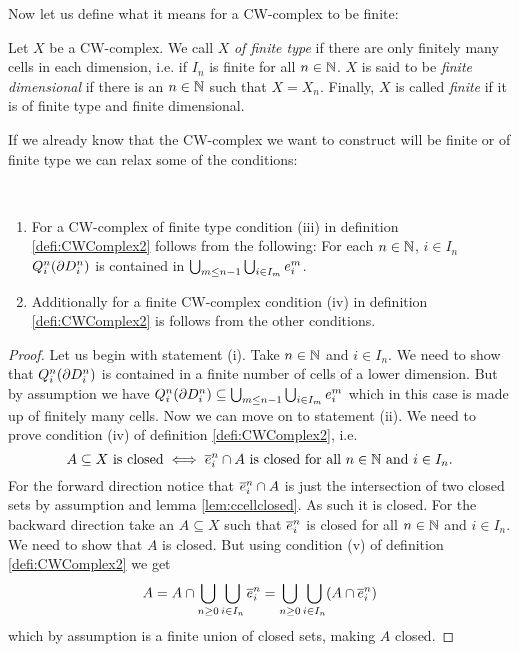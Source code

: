 Now let us define what it means for a CW-complex to be finite: 

\begin{defi}
    Let $X$ be a CW-complex. 
    We call $X$ \emph{of finite type} if there are only finitely many cells in each dimension, i.e. if $I_n$ is finite for all $n \in \bN$.
    $X$ is said to be \emph{finite dimensional} if there is an $n \in \bN$ such that $X = X_n$. 
    Finally, $X$ is called \emph{finite} if it is of finite type and finite dimensional.
\end{defi}

If we already know that the CW-complex we want to construct will be finite or of finite type we can relax some of the conditions: 

\begin{rem}~
    \begin{enumerate}
        \item For a CW-complex of finite type condition (iii) in definition \ref{defi:CWComplex2} follows from the following: 
        For each $n \in \bN$, $i \in I_n$ $Q_i^n(\boundary D_i^n)$ is contained in $\bigcup_{m \le n - 1}\bigcup_{i \in I_m}\ocell{m}{i}$. 
        \item Additionally for a finite CW-complex condition (iv) in definition \ref{defi:CWComplex2} is follows from the other conditions.
    \end{enumerate}
\end{rem}
\begin{proof}
    Let us begin with statement (i).
    Take $n \in \bN$ and $i \in I_n$.
    We need to show that $Q_i^n(\boundary D_i^n)$ is contained in a finite number of cells of a lower dimension. 
    But by assumption we have $Q_i^n(\boundary D_i^n) \subseteq \bigcup_{m \le n - 1}\bigcup_{i \in I_m}\ocell{m}{i}$ which in this case is made up of finitely many cells. 
    Now we can move on to statement (ii). 
    We need to prove condition (iv) of definition \ref{defi:CWComplex2}, i.e.
    \[A \subseteq X \text{ is closed} \iff \ccell{n}{i} \cap A \text{ is closed for all } n \in \bN \text{ and } i \in I_n.\]
    For the forward direction notice that $\ccell{n}{i} \cap A$ is just the intersection of two closed sets by assumption and lemma \ref{lem:ccellclosed}. 
    As such it is closed.
    For the backward direction take an $A \subseteq X$ such that $\ccell{n}{i}$ is closed for all $n \in \bN$ and $i \in I_n$. 
    We need to show that $A$ is closed. 
    But using condition (v) of definition \ref{defi:CWComplex2} we get 
    \[A = A \cap \bigcup_{n \ge 0}\bigcup_{i \in I_n} \ccell{n}{i} = \bigcup_{n \ge 0}\bigcup_{i \in I_n} (A \cap \ccell{n}{i})\]
    which by assumption is a finite union of closed sets, making $A$ closed.
\end{proof}

